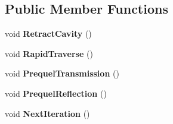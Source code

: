 \subsection*{Public Member Functions}
\begin{DoxyCompactItemize}
\item 
void {\bfseries Retract\+Cavity} ()\hypertarget{class_program_core_a324529dc700d5284cf4f867115b65a85}{}\label{class_program_core_a324529dc700d5284cf4f867115b65a85}

\item 
void {\bfseries Rapid\+Traverse} ()\hypertarget{class_program_core_acc1c4e2c0f626cf9241b96ccb7a201e7}{}\label{class_program_core_acc1c4e2c0f626cf9241b96ccb7a201e7}

\item 
void {\bfseries Prequel\+Transmission} ()\hypertarget{class_program_core_ae7f5cac9629aec644310374394167d88}{}\label{class_program_core_ae7f5cac9629aec644310374394167d88}

\item 
void {\bfseries Prequel\+Reflection} ()\hypertarget{class_program_core_af12c335af15f7a4d3b5bd68b94582e4c}{}\label{class_program_core_af12c335af15f7a4d3b5bd68b94582e4c}

\item 
void {\bfseries Next\+Iteration} ()\hypertarget{class_program_core_a7d80d0b034d474a75352917401b0c48b}{}\label{class_program_core_a7d80d0b034d474a75352917401b0c48b}

\end{DoxyCompactItemize}
